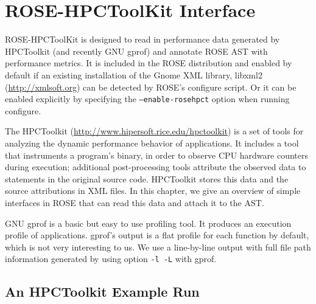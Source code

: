 \chapter{ROSE-HPCToolKit Interface}
\label{chap:rosehpct}
ROSE-HPCToolKit is designed to read in performance data generated
by HPCToolkit (and recently GNU gprof) and annotate ROSE AST with performance
metrics.
It is included in the ROSE distribution and 
enabled by default if  an existing installation of the Gnome XML library, libxml2
(\url{http://xmlsoft.org}) can be detected by ROSE's configure script.
Or it can be enabled explicitly by specifying the \texttt{--enable-rosehpct} option
when running configure.

The HPCToolkit (\url{http://www.hipersoft.rice.edu/hpctoolkit}) is a
set of tools for analyzing the dynamic performance behavior of
applications. It includes a tool that instruments a program's binary,
in order to observe CPU hardware counters during execution; additional
post-processing tools attribute the observed data to statements in the
original source code. HPCToolkit stores this data and the source
attributions in XML files. In this chapter, we give an overview of
simple interfaces in ROSE that can read this data and attach it to the
AST.

GNU gprof is a basic but easy to use profiling tool.
It produces an execution profile of applications. 
gprof's output is a flat profile for each function by default, which is not
very interesting to us.  
We use a line-by-line output with full file path information generated by using
option {\tt -l -L} with gprof.



\section{An HPCToolkit Example Run}
\label{chap:rosehpct:run}

